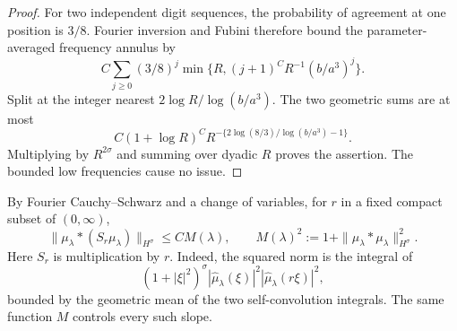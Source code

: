 \documentclass[11pt,a4paper]{amsart}
\numberwithin{equation}{section}
\theoremstyle{definition}
\begin{document}
\begin{proof}
For two independent digit sequences, the probability of agreement
at one position is \(3/8\). Fourier inversion and Fubini therefore
bound the parameter-averaged frequency annulus by
\[
C\sum_{j\geq0}(3/8)^j
\min\{R,(j+1)^C R^{-1}(b/a^3)^j\}.
\]
Split at the integer nearest \(2\log R/\log(b/a^3)\).
The two geometric sums are at most
\[
C(1+\log R)^C
R^{-\{2\log(8/3)/\log(b/a^3)-1\}}.
\]
Multiplying by \(R^{2\sigma}\) and summing over dyadic \(R\)
proves the assertion. The bounded low frequencies cause no issue.
\end{proof}

By Fourier Cauchy--Schwarz and a change of variables, for \(r\)
in a fixed compact subset of \((0,\infty)\),
\begin{equation}
\|\mu_\lambda*(S_r\mu_\lambda)\|_{H^\sigma}
\leq C M(\lambda),\qquad
M(\lambda)^2:=1+\|\mu_\lambda*\mu_\lambda\|_{H^\sigma}^2.
\label{eq:common-sobolev-bound}
\end{equation}
Here \(S_r\) is multiplication by \(r\). Indeed, the squared norm
is the integral of
\[
(1+|\xi|^2)^\sigma|\widehat\mu_\lambda(\xi)|^2
|\widehat\mu_\lambda(r\xi)|^2,
\]
bounded by the geometric mean
of the two self-convolution integrals.
The same function \(M\) controls every such slope.
\end{document}

